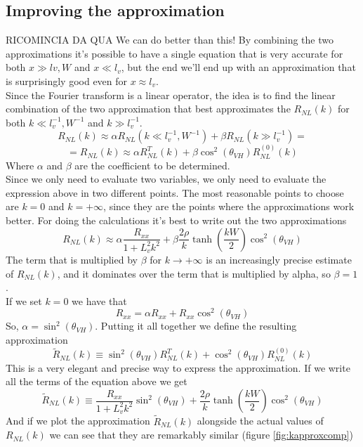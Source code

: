 \subsection{Improving the approximation}
RICOMINCIA DA QUA
We can do better than this! By combining the two approximations it's possible to have a single equation that is very accurate for both $x\gg lv,W$ and $x\ll l_v$, but the end we'll end up with an approximation that is surprisingly good even for  $x\approx l_v$.\\
Since the Fourier transform is a linear operator, the idea is to find the linear combination of the two approximation that best approximates the $R_{NL}(k)$ for both $k\ll l_v^{-1},W^{-1}$ and $k\gg l_v^{-1}$.
\[
    R_{NL}(k)\approx \alpha R_{NL}(k\ll l_v^{-1},W^{-1}) +\beta R_{NL}(k\gg l_v^{-1})=
\]
\[
    =R_{NL}(k)\approx \alpha R_{NL}^T(k) +\beta\cos^2(\theta_{VH}) R_{NL}^{(0)}(k)      
\]
Where $\alpha$ and $\beta$ are the coefficient to be determined.\\
Since we only need to evaluate two variables, we only need to evaluate the expression above in two different points. The most reasonable points to choose are $k=0$ and $k=+\infty$, since they are the points where the approximations work better. For doing the calculations it's best to write out the two approximations 
\[
    R_{NL}(k)\approx 
    \alpha \frac {R_{xx}}{1+L_v^2k^2}+
    \beta\frac {2\rho}{k}\tanh\left(\frac{kW}2\right)\cos^2(\theta_{VH})
\]
The term that is multiplied by $\beta$ for $k\to +\infty$ is an increasingly precise estimate of $R_{NL}(k)$, and it dominates over the term that is multiplied by alpha, so $\beta=1$.\\
If we set $k=0$ we have that
\[
    R_{xx}=\alpha R_{xx} +  R_{xx}\cos^2(\theta_{VH})   
\]
So, $\alpha=\sin^2(\theta_{VH})$. Putting it all together we define the resulting approximation
\begin{equation}
    \boxed{
        \tilde R_{NL}(k)\equiv
        \sin^2(\theta_{VH})R_{NL}^{T}(k)+
        \cos^2(\theta_{VH})R_{NL}^{(0)}(k)
    }
\end{equation}
This is a very elegant and precise way to express the approximation. If we write all the terms of the equation above we get
\begin{equation}
    \tilde R_{NL}(k)\equiv
    \frac {R_{xx}}{1+L_v^2k^2}\sin^2(\theta_{VH})+
    \frac {2\rho}{k}\tanh\left(\frac{kW}2\right)\cos^2(\theta_{VH})
\end{equation}
And if we plot the approximation $\tilde R_{NL}(k)$ alongside the actual values of $R_{NL}(k)$ we can see that they are remarkably similar (figure \ref{fig:kapproxcomp})
